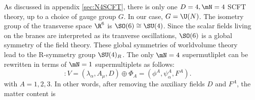 \documentclass{worksheetclass}
\begin{document}
        As discussed in appendix \ref{sec:N4SCFT}, there is only one $D=4,\mN=4$ SCFT theory, up to a choice of gauge group $G$. In our case, $G=\U(N)$. The isometry group of the transverse space $\R^6$ is $\SO(6)\cong\SU(4)$. Since the scalar fields living on the branes are interpreted as its tranverse oscillations, $\SO(6)$ is a global symmetry of the field theory. These global symmetries of worldvolume theory lead to the R-symmetry group $\SU(4)_R$. The only $\mN=4$ supermutliplet can be rewritten in terms of $\mN=1$ supermultiplets as follows:
        \begin{equation}
            [\mN = 4 \text{ vector multiplet}] : V = (\lambda_\alpha, A_\mu, D) \oplus \Phi_A = (\phi^A,\psi^A_\alpha,F^A).
        \end{equation}
        with $A=1,2,3$. In other words, after removing the auxiliary fields $D$ and $F^A$, the matter content is
\end{document}
